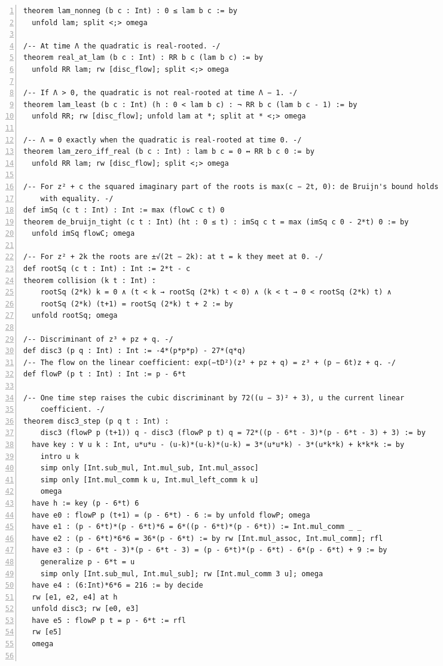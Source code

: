 \documentclass[10pt]{article}
\newcommand{\leansize}{\fontsize{5.5pt}{6.75pt}\selectfont}
\begin{document}
\begin{multicols}{2}
\begin{Verbatim}[numbers=left,firstnumber=1,numbersep=3pt,xleftmargin=2.6em,breaklines=true,breakanywhere=true,breakautoindent=false,breakindent=1.4em,breaksymbolleft={},breakanywheresymbolpre={},fontsize=\leansize]
theorem lam_nonneg (b c : Int) : 0 ≤ lam b c := by
  unfold lam; split <;> omega

/-- At time Λ the quadratic is real-rooted. -/
theorem real_at_lam (b c : Int) : RR b c (lam b c) := by
  unfold RR lam; rw [disc_flow]; split <;> omega

/-- If Λ > 0, the quadratic is not real-rooted at time Λ − 1. -/
theorem lam_least (b c : Int) (h : 0 < lam b c) : ¬ RR b c (lam b c - 1) := by
  unfold RR; rw [disc_flow]; unfold lam at *; split at * <;> omega

/-- Λ = 0 exactly when the quadratic is real-rooted at time 0. -/
theorem lam_zero_iff_real (b c : Int) : lam b c = 0 ↔ RR b c 0 := by
  unfold RR lam; rw [disc_flow]; split <;> omega

/-- For z² + c the squared imaginary part of the roots is max(c − 2t, 0): de Bruijn's bound holds
    with equality. -/
def imSq (c t : Int) : Int := max (flowC c t) 0
theorem de_bruijn_tight (c t : Int) (ht : 0 ≤ t) : imSq c t = max (imSq c 0 - 2*t) 0 := by
  unfold imSq flowC; omega

/-- For z² + 2k the roots are ±√(2t − 2k): at t = k they meet at 0. -/
def rootSq (c t : Int) : Int := 2*t - c
theorem collision (k t : Int) :
    rootSq (2*k) k = 0 ∧ (t < k → rootSq (2*k) t < 0) ∧ (k < t → 0 < rootSq (2*k) t) ∧
    rootSq (2*k) (t+1) = rootSq (2*k) t + 2 := by
  unfold rootSq; omega

/-- Discriminant of z³ + pz + q. -/
def disc3 (p q : Int) : Int := -4*(p*p*p) - 27*(q*q)
/-- The flow on the linear coefficient: exp(−tD²)(z³ + pz + q) = z³ + (p − 6t)z + q. -/
def flowP (p t : Int) : Int := p - 6*t

/-- One time step raises the cubic discriminant by 72((u − 3)² + 3), u the current linear
    coefficient. -/
theorem disc3_step (p q t : Int) :
    disc3 (flowP p (t+1)) q - disc3 (flowP p t) q = 72*((p - 6*t - 3)*(p - 6*t - 3) + 3) := by
  have key : ∀ u k : Int, u*u*u - (u-k)*(u-k)*(u-k) = 3*(u*u*k) - 3*(u*k*k) + k*k*k := by
    intro u k
    simp only [Int.sub_mul, Int.mul_sub, Int.mul_assoc]
    simp only [Int.mul_comm k u, Int.mul_left_comm k u]
    omega
  have h := key (p - 6*t) 6
  have e0 : flowP p (t+1) = (p - 6*t) - 6 := by unfold flowP; omega
  have e1 : (p - 6*t)*(p - 6*t)*6 = 6*((p - 6*t)*(p - 6*t)) := Int.mul_comm _ _
  have e2 : (p - 6*t)*6*6 = 36*(p - 6*t) := by rw [Int.mul_assoc, Int.mul_comm]; rfl
  have e3 : (p - 6*t - 3)*(p - 6*t - 3) = (p - 6*t)*(p - 6*t) - 6*(p - 6*t) + 9 := by
    generalize p - 6*t = u
    simp only [Int.sub_mul, Int.mul_sub]; rw [Int.mul_comm 3 u]; omega
  have e4 : (6:Int)*6*6 = 216 := by decide
  rw [e1, e2, e4] at h
  unfold disc3; rw [e0, e3]
  have e5 : flowP p t = p - 6*t := rfl
  rw [e5]
  omega


\end{Verbatim}
\end{multicols}
\end{document}
